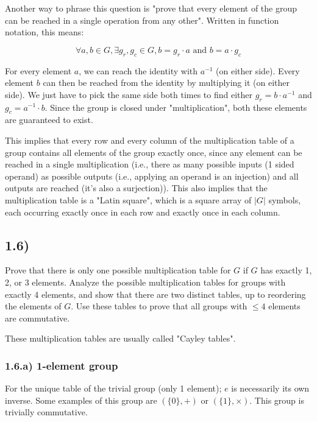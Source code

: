 \documentclass[12pt, letterpaper, twoside]{report}
\begin{document}
Another way to phrase this question is "prove that every element of the group can be reached in a single operation from any other". Written in function notation, this means:

$$\forall a, b \in G, \exists g_r, g_c \in G, b = g_r \cdot a \text { and } b = a \cdot g_c$$

For every element $a$, we can reach the identity with $a^{-1}$ (on either side). Every element $b$ can then be reached from the identity by multiplying it (on either side). We just have to pick the same side both times to find either $g_r = b \cdot a^{-1}$ and $g_c = a^{-1} \cdot b$. Since the group is closed under "multiplication", both these elements are guaranteed to exist.

This implies that every row and every column of the multiplication table of a group contains all elements of the group exactly once, since any element can be reached in a single multiplication (i.e., there as many possible inputs (1 sided operand) as possible outputs (i.e., applying an operand is an injection) and all outputs are reached (it's also a surjection)). This also implies that the multiplication table is a "Latin square", which is a square array of $|G|$ symbols, each occurring exactly once in each row and exactly once in each column. 



\subsection*{1.6)}

Prove that there is only one possible multiplication table for $G$ if $G$ has exactly 1, 2, or 3 elements. Analyze the possible multiplication tables for groups with exactly 4 elements, and show that there are two distinct tables, up to reordering the elements of $G$. Use these tables to prove that all groups with $\leq 4$ elements are commutative.

These multiplication tables are usually called "Cayley tables".


\subsubsection*{1.6.a) 1-element group}

For the unique table of the trivial group (only 1 element); $e$ is necessarily its own inverse. Some examples of this group are $(\{0\}, +)$ or $(\{1\}, \times)$. This group is trivially commutative.
\end{document}
